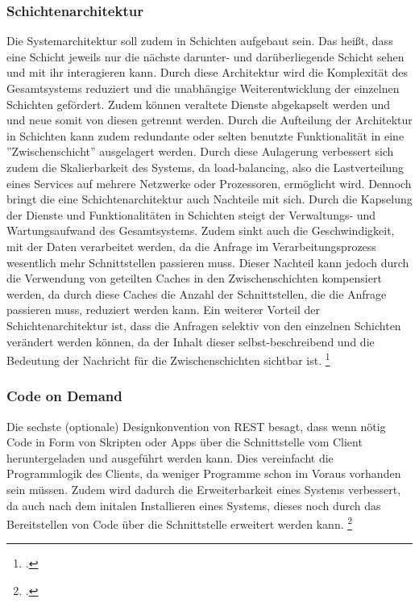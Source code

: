 \subsubsection{Schichtenarchitektur}

Die Systemarchitektur soll zudem in Schichten aufgebaut sein. Das hei{\ss}t, dass eine Schicht jeweils nur die nächste darunter- und darüberliegende Schicht sehen und mit ihr interagieren kann. Durch diese Architektur wird die Komplexität des Gesamtsystems reduziert und die unabhängige Weiterentwicklung der einzelnen Schichten gefördert. Zudem können veraltete Dienste abgekapselt werden und und neue somit von diesen getrennt werden. Durch die Aufteilung der Architektur in Schichten kann zudem redundante oder selten benutzte Funktionalität in eine ''Zwischenschicht'' ausgelagert werden. Durch diese Aulagerung verbessert sich zudem die Skalierbarkeit des Systems, da load-balancing, also die Lastverteilung eines Services auf mehrere Netzwerke oder Prozessoren, ermöglicht wird. Dennoch bringt die eine Schichtenarchitektur auch Nachteile mit sich. Durch die Kapselung der Dienste und Funktionalitäten in Schichten steigt der Verwaltungs- und Wartungsaufwand des Gesamtsystems. Zudem sinkt auch die Geschwindigkeit, mit der Daten verarbeitet werden, da die Anfrage im Verarbeitungsprozess wesentlich mehr Schnittstellen passieren muss. Dieser Nachteil kann jedoch durch die Verwendung von geteilten Caches in den Zwischenschichten kompensiert werden, da durch diese Caches die Anzahl der Schnittstellen, die die Anfrage passieren muss, reduziert werden kann. Ein weiterer Vorteil der Schichtenarchitektur ist, dass die Anfragen selektiv von den einzelnen Schichten verändert werden können, da der Inhalt dieser selbst-beschreibend und die Bedeutung der Nachricht für die Zwischenschichten sichtbar ist. \footcite[Vgl.][S. 82f]{fielding_architectural_2000}

\subsubsection{Code on Demand}

Die sechste (optionale) Designkonvention von REST besagt, dass wenn nötig Code in Form von Skripten oder Apps über die Schnittstelle vom Client heruntergeladen und ausgeführt werden kann. Dies vereinfacht die Programmlogik des Clients, da weniger Programme schon im Voraus vorhanden sein müssen. Zudem wird dadurch die Erweiterbarkeit eines Systems verbessert, da auch nach dem initalen Installieren eines Systems, dieses noch durch das Bereitstellen von Code über die Schnittstelle erweitert werden kann. \footcite[Vgl.][S. 84f]{fielding_architectural_2000}

